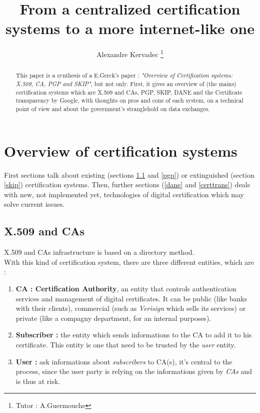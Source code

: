 \documentclass[journal, a4paper]{IEEEtran}
\begin{document}
	\title{From a centralized certification systems to a more internet-like one}
	\author{Alexandre Kervadec
	\thanks{Tutor : A.Guermouche}}
	\maketitle

\begin{abstract}
This paper is a synthesis of a E.Gerck's paper : \textit{"Overview of Certification systems: X.509, CA, PGP and SKIP"}\cite{gerck1998overview}, but not only. First, it gives an overview of (the mains) certification systems which are X.509 and CAs, PGP, SKIP, DANE and the Certificate transparency by Google, with thoughts on pros and cons of each system, on a technical point of view and about the government's stranglehold on data exchanges.
\end{abstract}

\section{Overview of certification systems}

First sections talk about existing (sections \ref{x509} and \ref{pgp}) or extinguished (section \ref{skip}) certification systems. Then, further sections (\ref{dane} and \ref{certtrans}) deals with new, not implemented yet, technologies of digital certification which may solve current issues. 


\subsection{X.509 and CAs}
\label{x509}

X.509 and CAs\cite{rfc3647} infrastructure is based on a directory method.\\
With this kind of certification system, there are three different entities, which are :

\begin{enumerate}
	\item \textbf{CA : Certification Authority}, an entity that controls authentication services and management of digital certificates. It can be public (like banks with their clients), commercial (such as \textit{Verisign} which sells its services) or private (like a compagny department, for an internal purposes).
	\item \textbf{Subscriber :} the entity which sends informations to the CA to add it to his certificate. This entity is one that need to be trusted by the \textit{user} entity.
	\item \textbf{User :} ask informations about \textit{subscribers} to CA(s), it's central to the process, since the user party is relying on the informations given by \textit{CAs} and is thus at risk.
\end{enumerate}
\end{document}
